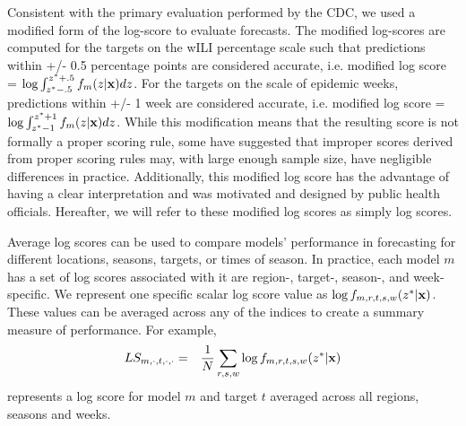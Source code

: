 \documentclass{article}
\begin{document}
Consistent with the primary evaluation performed by the CDC, we used a modified form of the log-score to evaluate forecasts. 
The modified log-scores are computed for the targets on the wILI percentage scale such that predictions within +/- 0.5 percentage points are considered accurate, i.e. modified log score = $\log \int_{z^* -.5}^{z^* + .5} f_m(z|{\bf{x}})dz$. 
For the targets on the scale of epidemic weeks, predictions within +/- 1 week are considered accurate, i.e. modified log score = $\log \int_{z^* -1}^{z^* + 1} f_m(z|{\bf{x}})dz$. 
While this modification means that the resulting score is not formally a proper scoring rule, some have suggested that improper scores derived from proper scoring rules may, with large enough sample size, have negligible differences in practice.\cite{Gneiting2007} %
Additionally, this modified log score has the advantage of having a clear interpretation and was  motivated and designed by public health officials.
Hereafter, we will refer to these modified log scores as simply log scores.

Average log scores can be used to compare models' performance in forecasting for different locations, seasons, targets, or times of season.
In practice, each model $m$ has a set of log scores associated with it are region-, target-, season-, and week-specific.
We represent one specific scalar log score value as $\log f_{m,r,t,s,w}(z^*|\bf{x})$. 
These values can be averaged across any of the indices to create a summary measure of performance.
For example,
\begin{eqnarray}
LS_{m,\cdot,t,\cdot,\cdot} & = & \frac{1}{N} \sum_{r,s,w} \log f_{m,r,t,s,w}(z^*|{\bf x})
\end{eqnarray}
represents a log score for model $m$ and target $t$ averaged across all regions, seasons and weeks.
\end{document}
